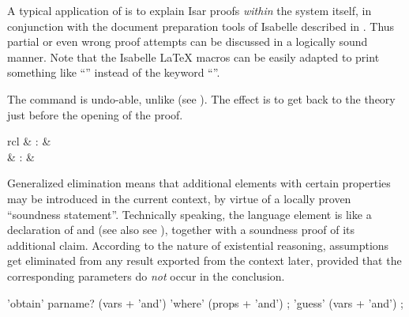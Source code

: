 \begin{isabellebody}
\begin{isamarkuptext}
  A typical application of \mbox{} is to explain Isar proofs
  \emph{within} the system itself, in conjunction with the document
  preparation tools of Isabelle described in \cite{isabelle-sys}.
  Thus partial or even wrong proof attempts can be discussed in a
  logically sound manner.  Note that the Isabelle {\LaTeX} macros can
  be easily adapted to print something like ``\isa{{\isachardoublequote}{\isasymdots}{\isachardoublequote}}'' instead of
  the keyword ``\mbox{}''.

  \medskip The \mbox{} command is undo-able, unlike
  \mbox{} (see ).  The effect is to
  get back to the theory just before the opening of the proof.%
\end{isamarkuptext}%
\isamarkuptrue%
%
\isamarkuptrue%
%
\begin{isamarkuptext}%
\begin{matharray}{rcl}
    \mbox{} & : &  \\
    \mbox{}\isa{{\isachardoublequote}\isactrlsup {\isacharasterisk}{\isachardoublequote}} & : &  \\
  \end{matharray}

  Generalized elimination means that additional elements with certain
  properties may be introduced in the current context, by virtue of a
  locally proven ``soundness statement''.  Technically speaking, the
  \mbox{} language element is like a declaration of
  \mbox{} and \mbox{} (see also see
  ), together with a soundness proof of its
  additional claim.  According to the nature of existential reasoning,
  assumptions get eliminated from any result exported from the context
  later, provided that the corresponding parameters do \emph{not}
  occur in the conclusion.

  \begin{rail}
    'obtain' parname? (vars + 'and') 'where' (props + 'and')
    ;
    'guess' (vars + 'and')
    ;
  \end{rail}


\end{isamarkuptext}
\end{isabellebody}
